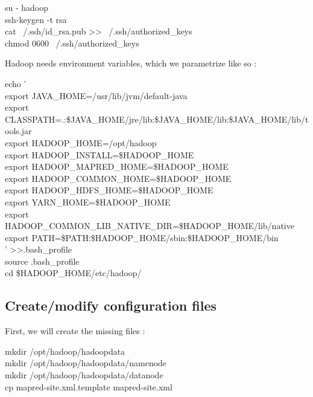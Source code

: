 \documentclass[a4paper]{article}
\begin{document}
\begin{center}
\begin{tcolorbox}[width=0.8\linewidth,colframe=black!5!white]
su - hadoop
\\ssh-keygen -t rsa
\\cat ~/.ssh/id\_rsa.pub >> ~/.ssh/authorized\_keys
\\chmod 0600 ~/.ssh/authorized\_keys
\end{tcolorbox}
\end{center}

Hadoop needs environment variables, which we parametrize like so :
\begin{center}
\begin{tcolorbox}[width=0.8\linewidth,colframe=black!5!white]
echo '
\\export JAVA\_HOME=/usr/lib/jvm/default-java
\\export CLASSPATH=.:\$JAVA\_HOME/jre/lib:\$JAVA\_HOME/lib:\$JAVA\_HOME/lib/tools.jar
\\export HADOOP\_HOME=/opt/hadoop
\\export HADOOP\_INSTALL=\$HADOOP\_HOME
\\export HADOOP\_MAPRED\_HOME=\$HADOOP\_HOME
\\export HADOOP\_COMMON\_HOME=\$HADOOP\_HOME
\\export HADOOP\_HDFS\_HOME=\$HADOOP\_HOME
\\export YARN\_HOME=\$HADOOP\_HOME
\\export HADOOP\_COMMON\_LIB\_NATIVE\_DIR=\$HADOOP\_HOME/lib/native
\\export PATH=\$PATH:\$HADOOP\_HOME/sbin:\$HADOOP\_HOME/bin
\\' \textgreater \textgreater .bash\_profile
\\source .bash\_profile
\\cd \$HADOOP\_HOME/etc/hadoop/
\end{tcolorbox}
\end{center}
%
%
%
%
\subsection{Create/modify configuration files}
First, we will create the missing files :
\begin{center}
\begin{tcolorbox}[width=0.8\linewidth,colframe=black!5!white]
mkdir /opt/hadoop/hadoopdata
\\mkdir /opt/hadoop/hadoopdata/namenode
\\mkdir /opt/hadoop/hadoopdata/datanode
\\cp mapred-site.xml.template mapred-site.xml
\end{tcolorbox}
\end{center}
\end{document}

